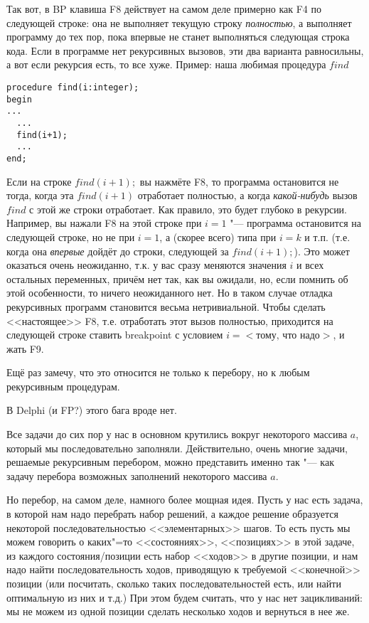 Так вот, в BP клавиша F8 действует на самом деле примерно как F4 по следующей 
строке: она не выполняет текущую строку \textit{полностью}, а выполняет программу до тех 
пор, пока впервые не станет выполняться следующая строка кода. Если в программе 
нет рекурсивных вызовов, эти два варианта равносильны, а вот если рекурсия есть, 
то все хуже. Пример: наша любимая процедура $find$
\begin{codesampleo}\begin{verbatim}
procedure find(i:integer);
begin
...
  ...
  find(i+1);
  ...
end;
\end{verbatim}
\end{codesampleo}
Если на строке $find(i+1);$ вы нажмёте F8, то программа остановится не тогда, 
когда эта $find(i+1)$ отработает полностью, а когда \textit{какой-нибудь} вызов $find$ с 
этой же строки отработает. Как правило, это будет глубоко в рекурсии. Например, 
вы нажали F8 на этой строке при $i=1$ "--- программа остановится на следующей строке, но не 
при $i=1$, а (скорее всего) типа при $i=k$ и т.п. (т.е. когда она \textit{впервые} дойдёт до 
строки, следующей за $find(i+1);$). Это может оказаться очень  
неожиданно, т.к. у вас сразу меняются значения $i$ и всех остальных переменных, 
причём нет так, как вы ожидали, но, если помнить об этой особенности, то ничего 
неожиданного нет. Но в таком случае отладка рекурсивных программ становится 
весьма нетривиальной. Чтобы сделать <<настоящее>> F8, т.е. отработать этот вызов 
полностью, приходится на следующей строке ставить breakpoint с условием 
$i=<\mbox{тому, что надо}>$, и жать F9.

Ещё раз замечу, что это относится не только к перебору, но к любым рекурсивным 
процедурам.

В Delphi (и FP?) этого бага вроде нет.

Все задачи до сих пор у нас в основном крутились вокруг некоторого массива $a$, который мы последовательно заполняли. 
Действительно, очень многие задачи, решаемые рекурсивным перебором, можно представить именно так
"--- как задачу перебора возможных заполнений некоторого массива $a$.

Но перебор, на самом деле, намного более мощная идея. 
Пусть у нас есть задача, в которой нам надо перебрать набор решений, а каждое решение образуется
некоторой последовательностью <<элементарных>> шагов. 
То есть пусть мы можем говорить о каких"=то <<состояниях>>, <<позициях>> в этой задаче, из каждого
состояния/позиции есть набор <<ходов>> в другие позиции, и нам надо найти последовательность ходов,
приводящую к требуемой <<конечной>> позиции (или посчитать, сколько таких последовательностей есть,
или найти оптимальную из них и т.д.) 
При этом будем считать, что у нас нет зацикливаний: мы не можем из одной позиции сделать несколько ходов
и вернуться в нее же. 

